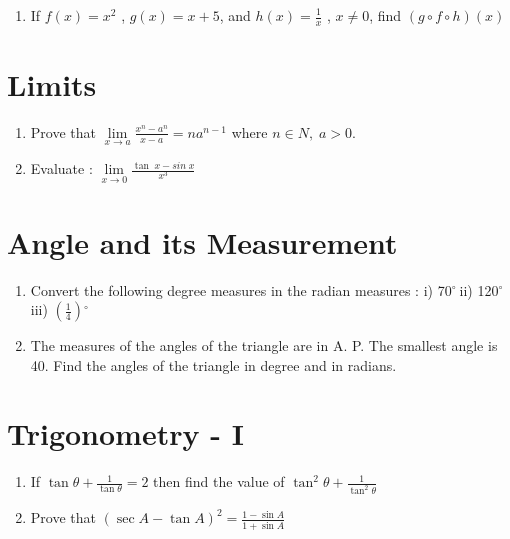 \documentclass[14pt]{article}
\newcommand{\degree}{$^{\circ}\ $} %
\begin{document}
\begin{multicols}{2}
\begin{enumerate}
\item If $f (x) = x^2$ , $g (x) = x + 5$, and $h(x) = \frac{1}{x}$ ,
	$x \neq 0$, find $(g \circ f \circ h) (x)$
\end{enumerate} 

\section{Limits}
\noindent
\begin{enumerate}

\item Prove that $ \lim\limits_{x \to a} \frac{x^n - a^n}{x - a}=na^{n-1}$ where $n \in N,\;a>0.$

\item Evaluate : $ \lim\limits_{x \to 0} \frac{\tan\;x - sin\;x}{x^3} $ 

\end{enumerate} 


\section{Angle and its Measurement}
\noindent
\begin{enumerate}

\item Convert the following degree measures
in the radian measures : i) 70\degree ii) 120\degree iii) $\left(\frac{1}{4}\right)$\degree

\item The measures of the angles of the
triangle are in A. P. The smallest angle
is 40. Find the angles of the triangle in
degree and in radians.

\end{enumerate} 

\section{Trigonometry - I}
\noindent
\begin{enumerate}
\item If $\tan \theta + \frac{1}{\tan \theta}=2$ then find the value of $\tan^2\theta + \frac{1}{\tan^2\theta}$ 

\item  Prove that $(\sec A - \tan A)^2=\frac{1-\sin A}{1+\sin A}$
\end{enumerate}


\end{multicols}
\end{document}
